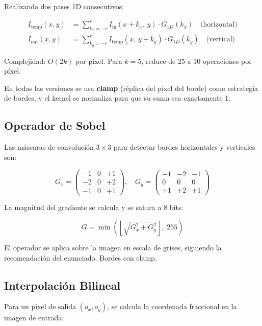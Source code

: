 \documentclass[12pt,a4paper]{article}
\begin{document}
Realizando dos pases 1D consecutivos:

\begin{align}
I_{\text{temp}}(x,y) &= \sum_{k_x=-r}^{r} I_{\text{in}}(x+k_x,\, y) \cdot G_{1D}(k_x) \quad \text{(horizontal)} \\
I_{\text{out}}(x,y)  &= \sum_{k_y=-r}^{r} I_{\text{temp}}(x,\, y+k_y) \cdot G_{1D}(k_y) \quad \text{(vertical)}
\end{align}

Complejidad: $O(2k)$ por p\'ixel. Para $k=5$, reduce de 25 a 10 operaciones por p\'ixel.

En todas las versiones se usa \textbf{clamp} (r\'eplica del p\'ixel del borde) como estrategia de bordes, y el kernel se normaliza para que su suma sea exactamente 1.

\subsection{Operador de Sobel}

Las m\'ascaras de convoluci\'on $3 \times 3$ para detectar bordes horizontales y verticales son:

\begin{equation}
G_x = \begin{pmatrix}-1 & 0 & +1\\-2 & 0 & +2\\-1 & 0 & +1\end{pmatrix}, \quad
G_y = \begin{pmatrix}-1 & -2 & -1\\0 & 0 & 0\\+1 & +2 & +1\end{pmatrix}
\end{equation}

La magnitud del gradiente se calcula y se satura a 8 bits:

\begin{equation}
G = \min\!\left(\left\lfloor\sqrt{G_x^2 + G_y^2}\right\rfloor,\; 255\right)
\end{equation}

El operador se aplica sobre la imagen en escala de grises, siguiendo la recomendaci\'on del enunciado. Bordes con clamp.

\subsection{Interpolaci\'on Bilineal}

Para un p\'ixel de salida $(o_x, o_y)$, se calcula la coordenada fraccional en la imagen de entrada:
\end{document}
